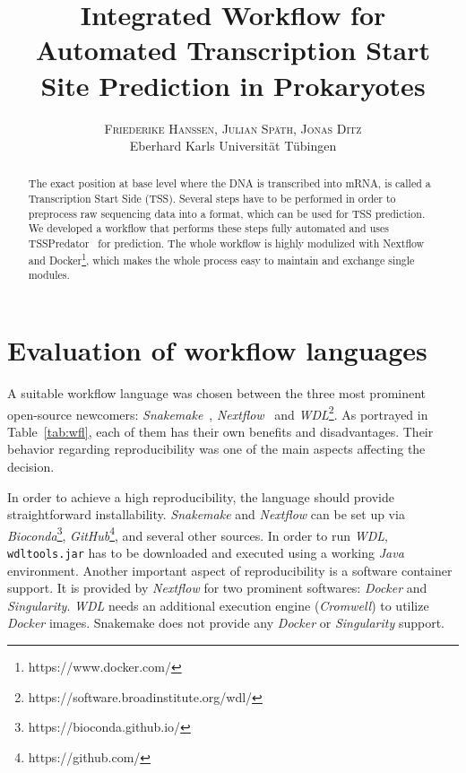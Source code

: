 \documentclass[twoside]{article}
\title{\vspace{-15mm}\fontsize{24pt}{10pt}\selectfont\textbf{Integrated Workflow for Automated Transcription Start Site Prediction in Prokaryotes}} %
\author{
\large
\textsc{Friederike Hanssen, Julian Sp\"ath, Jonas Ditz}\\[2mm] %
\normalsize Eberhard Karls Universit\"at T\"ubingen \\ %
\vspace{-5mm}
}
\date{}
\begin{document}
\maketitle %

\thispagestyle{fancy} %

\begin{abstract}
\noindent The exact position at base level where the DNA is transcribed into mRNA, is called a Transcription Start Side (TSS). Several steps have to be performed in order to preprocess raw sequencing data into a format, which can be used for TSS prediction. We developed a workflow that performs these steps fully automated and uses TSSPredator~\cite{dugar2013high} for prediction. The whole workflow is highly modulized with Nextflow~\cite{di2017nextflow} and Docker\footnote{https://www.docker.com/}, which makes the whole process easy to maintain and exchange single modules.
\end{abstract}



\section{Evaluation of workflow languages}

A suitable workflow language was chosen between the three most prominent open-source newcomers: \textit{Snakemake}~\cite{snakemake}, \textit{Nextflow}~\cite{di2017nextflow} and \textit{WDL}\footnote{https://software.broadinstitute.org/wdl/}. As portrayed in Table~\ref{tab:wfl}, each of them has their own benefits and disadvantages. 
Their behavior regarding reproducibility was one of the main aspects affecting the decision. 

In order to achieve a high reproducibility, the language should provide straightforward installability. \textit{Snakemake} and \textit{Nextflow} can be set up via \textit{Bioconda}\footnote{https://bioconda.github.io/}, \textit{GitHub}\footnote{https://github.com/}, and several other sources. In order to run \textit{WDL}, \texttt{wdltools.jar} has to be downloaded and executed using a working \textit{Java} environment. 
Another important aspect of reproducibility is a software container support. It is provided by \textit{Nextflow} for two prominent softwares: \textit{Docker}  and \textit{Singularity}. \textit{WDL} needs an additional execution engine (\textit{Cromwell}) to utilize \textit{Docker} images. Snakemake does not provide any \textit{Docker} or \textit{Singularity} support.\par
\end{document}

